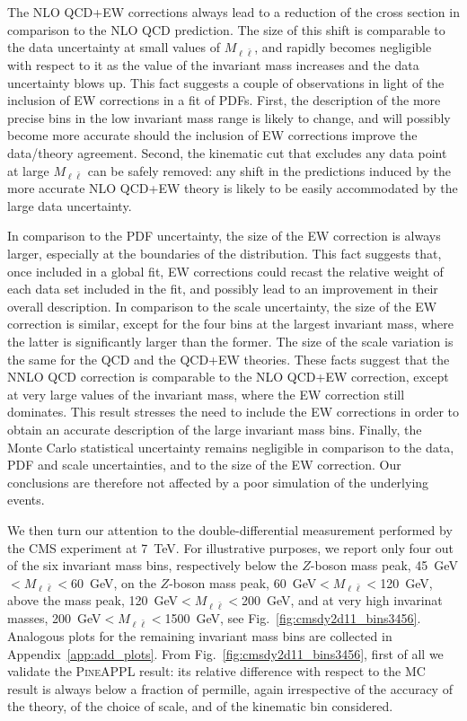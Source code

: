 The NLO QCD+EW corrections always lead to a reduction of the cross section in
comparison to the NLO QCD prediction. The size of this shift is comparable to
the data uncertainty at small values of $M_{\ell\bar\ell}$, and rapidly becomes
negligible with respect to it as the value of the invariant mass increases
and the data uncertainty blows up. This fact suggests a couple of observations
in light of the inclusion of EW corrections in a fit of PDFs. First, the
description of the more precise bins in the low invariant mass range is likely
to change, and will possibly become more accurate should the inclusion of EW
corrections improve the data/theory agreement. Second, the kinematic cut that
excludes any data point at large $M_{\ell\bar\ell}$ can be safely removed: any
shift in the predictions induced by the more accurate NLO QCD+EW theory is
likely to be easily accommodated by the large data uncertainty.

In comparison to the PDF uncertainty, the size of the EW correction is
always larger, especially at the boundaries of the distribution. This fact
suggests that, once included in a global fit, EW corrections could recast the
relative weight of each data set included in the fit, and possibly lead to
an improvement in their overall description. In comparison to the scale
uncertainty, the size of the EW correction is similar, except for the four bins
at the largest invariant mass, where the latter is significantly larger than
the former. The size of the scale variation is the same for the QCD and the
QCD+EW theories. These facts suggest that the NNLO QCD correction is comparable
to the NLO QCD+EW correction, except at very large values of the invariant mass,
where the EW correction still dominates. This result stresses the need to
include the EW corrections in order to obtain an accurate description of the
large invariant mass bins. Finally, the Monte Carlo statistical
uncertainty remains negligible in comparison to the data, PDF and scale
uncertainties, and to the size of the EW correction. Our conclusions are
therefore not affected by a poor simulation of the underlying events.

We then turn our attention to the double-differential measurement performed by
the CMS experiment at 7~TeV. For illustrative purposes, we report only four out
of the six invariant mass bins, respectively below the $Z$-boson mass peak,
45~GeV$<M_{\ell\bar\ell}<$60~GeV, on the $Z$-boson mass peak,
60~GeV$<M_{\ell\bar\ell}<$120~GeV, above the mass peak,
120~GeV$<M_{\ell\bar\ell}<$200~GeV, and at very high invarinat masses,
200~GeV$<M_{\ell\bar\ell}<$1500~GeV, see Fig.~\ref{fig:cmsdy2d11_bins3456}.
Analogous plots for the remaining invariant mass bins are collected in
Appendix~\ref{app:add_plots}. From Fig.~\ref{fig:cmsdy2d11_bins3456},
first of all we validate the \textsc{PineAPPL} result: its relative difference
with respect to the \textsc{MC} result is always below a fraction of permille,
again irrespective of the accuracy of the theory, of the choice of scale, and
of the kinematic bin considered. 

